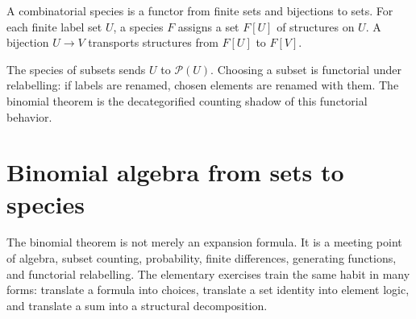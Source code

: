 A combinatorial species is a functor from finite sets and bijections to sets.  For each finite label set \(U\), a species \(F\) assigns a set \(F[U]\) of structures on \(U\).  A bijection \(U\to V\) transports structures from \(F[U]\) to \(F[V]\).

The species of subsets sends \(U\) to \(\mathcal P(U)\).  Choosing a subset is functorial under relabelling: if labels are renamed, chosen elements are renamed with them.  The binomial theorem is the decategorified counting shadow of this functorial behavior.

\section{Binomial algebra from sets to species}

The binomial theorem is not merely an expansion formula.  It is a meeting point of algebra, subset counting, probability, finite differences, generating functions, and functorial relabelling.  The elementary exercises train the same habit in many forms: translate a formula into choices, translate a set identity into element logic, and translate a sum into a structural decomposition.
